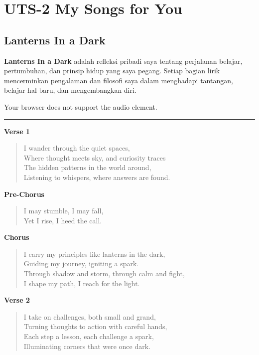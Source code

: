 \documentclass[
  letterpaper,
  DIV=11,
  numbers=noendperiod]{scrreprt}
\begin{document}

\chapter{UTS-2 My Songs for You}\label{uts-2-my-songs-for-you}

\section{Lanterns In a Dark}\label{lanterns-in-a-dark}

\textbf{Lanterns In a Dark} adalah refleksi pribadi saya tentang
perjalanan belajar, pertumbuhan, dan prinsip hidup yang saya pegang.
Setiap bagian lirik mencerminkan pengalaman dan filosofi saya dalam
menghadapi tantangan, belajar hal baru, dan mengembangkan diri.

Your browser does not support the audio element.

\begin{center}\rule{0.5\linewidth}{0.5pt}\end{center}

\textbf{Verse 1}

\begin{quote}
I wander through the quiet spaces,\\
Where thought meets sky, and curiosity traces\\
The hidden patterns in the world around,\\
Listening to whispers, where answers are found.
\end{quote}

\textbf{Pre-Chorus}

\begin{quote}
I may stumble, I may fall,\\
Yet I rise, I heed the call.
\end{quote}

\textbf{Chorus}

\begin{quote}
I carry my principles like lanterns in the dark,\\
Guiding my journey, igniting a spark.\\
Through shadow and storm, through calm and fight,\\
I shape my path, I reach for the light.
\end{quote}

\textbf{Verse 2}

\begin{quote}
I take on challenges, both small and grand,\\
Turning thoughts to action with careful hands,\\
Each step a lesson, each challenge a spark,\\
Illuminating corners that were once dark.
\end{quote}
\end{document}

